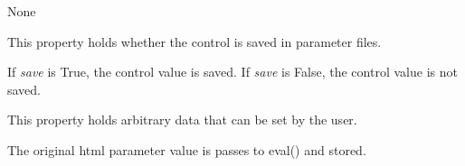 \documentclass[letterpaper,10pt,english]{sphinxmanual}
\begin{document}
\begin{fulllineitems}
\begin{fulllineitems}
\end{fulllineitems}


\begin{fulllineitems}
\label{api:controls.Image.right_release_position}
None

\end{fulllineitems}


\begin{fulllineitems}
\label{api:controls.Image.save}
This property holds whether the control is saved in parameter files.

If \emph{save} is True, the control value is saved.
If \emph{save} is False, the control value is not saved.

\end{fulllineitems}


\begin{fulllineitems}
\label{api:controls.Image.user}
This property holds arbitrary data that can be set by the user.

The original html parameter value is passes to eval() and stored.

\end{fulllineitems}


\end{fulllineitems}

\end{document}
